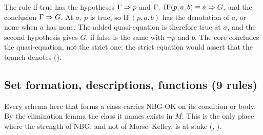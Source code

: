 The rule if-true has the hypotheses $\Gamma\Rightarrow p$ and
$\Gamma,\ \mathrm{IF}(p,a,b)\equiv a\Rightarrow G$, and the conclusion
$\Gamma\Rightarrow G$.  At $\sigma$, $p$ is true, so $\mathrm{IF}(p,a,b)$
has the denotation of $a$, or none when $a$ has none.  The added
quasi-equation is therefore true at $\sigma$, and the second hypothesis
gives $G$.  if-false is the same with $\neg p$ and $b$.  The core
concludes the quasi-equation, not the strict one: the strict equation
would assert that the branch denotes ().

\subsection{Set formation, descriptions, functions (9 rules)}

Every schema here that forms a class carries $\mathrm{NBG\text{-}OK}$ on
its condition or body.  By the elimination lemma the class it names
exists in $M$.  This is the only place where the strength of NBG, and
not of Morse--Kelley, is at stake (, ).
